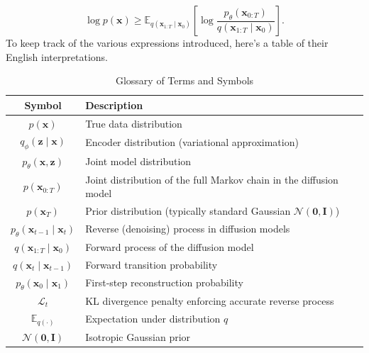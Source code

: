 \documentclass[11pt,addpoints,answers]{exam}
\newcommand{\xv}{\mathbf{x}}
\begin{document}
\begin{questions}
\begin{equation}
   \log p(\xv) \ge \mathbb{E}_{q(\xv_{1:T}\mid \xv_0)}\left[\log \frac{p_\theta(\xv_{0:T})}{q(\xv_{1:T}\mid \xv_0)}\right].
    \label{eq:elbo_diffusion}
\end{equation}
\clearpage
To keep track of the various expressions introduced, here's a table of their English interpretations.
\begin{table}[h]
    \centering
    \renewcommand{\arraystretch}{1.3}
    \begin{tabular}{|c|l|}
        \hline
        \textbf{Symbol} & \textbf{Description} \\
        \hline
        \( p(\xv) \) & True data distribution \\
        \( q_\phi(\boldsymbol{z} \mid \xv) \) & Encoder distribution (variational approximation) \\
        \( p_\theta(\xv, \boldsymbol{z}) \) & Joint model distribution \\
        \( p(\xv_{0:T}) \) & Joint distribution of the full Markov chain in the diffusion model \\
        \( p(\xv_T) \) & Prior distribution (typically standard Gaussian \( \mathcal{N}(\boldsymbol{0}, \boldsymbol{I}) \)) \\
        \( p_\theta(\xv_{t-1} \mid \xv_t) \) & Reverse (denoising) process in diffusion models \\
        \( q(\xv_{1:T} \mid \xv_0) \) & Forward process of the diffusion model \\
        \( q(\xv_t \mid \xv_{t-1}) \) & Forward transition probability \\
        \( p_\theta(\xv_0 \mid \xv_1) \) & First-step reconstruction probability \\
        \( \mathcal{L}_t \) & KL divergence penalty enforcing accurate reverse process \\
        \( \mathbb{E}_{q(\cdot)} \) & Expectation under distribution \( q \) \\
        \( \mathcal{N}(\boldsymbol{0}, \boldsymbol{I}) \) & Isotropic Gaussian prior \\
        \hline
    \end{tabular}
    \caption{Glossary of Terms and Symbols}
    \label{tab:glossary}
\end{table}

\begin{parts}



\end{parts}
\end{questions}
\end{document}
